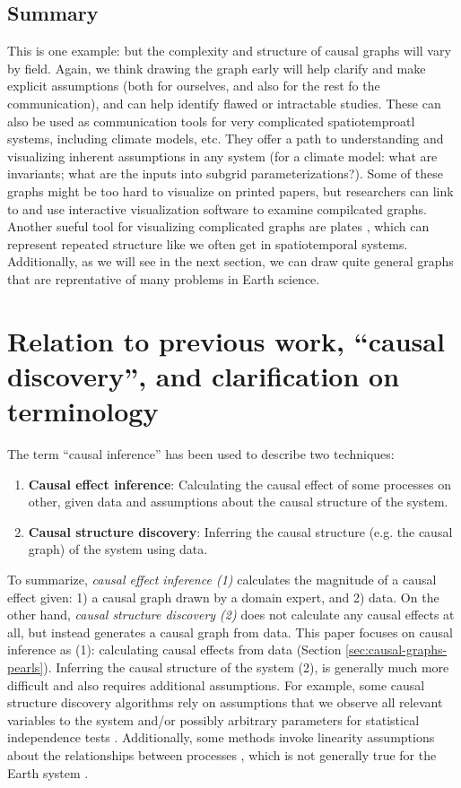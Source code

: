 \documentclass[12pt]{article}
\begin{document}
\subsection{Summary}

This is one example: but the complexity and structure of causal graphs
will vary by field. Again, we think drawing the graph early will help
clarify and make explicit assumptions (both for ourselves, and also
for the rest fo the communication), and can help identify flawed or
intractable studies. These can also be used as communication tools for
very complicated spatiotemproatl systems, including climate models,
etc. They offer a path to understanding and visualizing inherent
assumptions in any system (for a climate model: what are invariants;
what are the inputs into subgrid parameterizations?). Some of these
graphs might be too hard to visualize on printed papers, but
researchers can link to and use interactive visualization software to
examine compilcated graphs. Another sueful tool for visualizing
complicated graphs are plates \citep{bishop2006pattern}, which can
represent repeated structure like we often get in spatiotemporal
systems. Additionally, as we will see in the next section, we can draw
quite general graphs that are reprentative of many problems in Earth
science.

\section{Relation to previous work, ``causal discovery'', and
  clarification on terminology}
\label{sec:discovery}

The term ``causal inference'' has been used to describe two
techniques:

\begin{enumerate}
\item \textbf{Causal effect inference}: Calculating the causal effect
  of some processes on other, given data and assumptions about the
  causal structure of the system.
\item \textbf{Causal structure discovery}: Inferring the causal
  structure (e.g. the causal graph) of the system using data.
\end{enumerate}

To summarize, \textit{causal effect inference (1)} calculates the
magnitude of a causal effect given: 1) a causal graph drawn by a
domain expert, and 2) data. On the other hand, \textit{causal
  structure discovery (2)} does not calculate any causal effects at
all, but instead generates a causal graph from data.  This paper
focuses on causal inference as (1): calculating causal effects from
data (Section \ref{sec:causal-graphs-pearls}). Inferring the causal
structure of the system (2), is generally much more difficult and also
requires additional assumptions. For example, some causal structure
discovery algorithms rely on assumptions that we observe all relevant
variables to the system and/or possibly arbitrary parameters for
statistical independence tests
\citep{runge2019inferring}. Additionally, some methods invoke
linearity assumptions about the relationships between processes
\citep{krich2019causal}, which is not generally true for the Earth
system \citep{palmer-nonlinaer-1999}.
\end{document}
